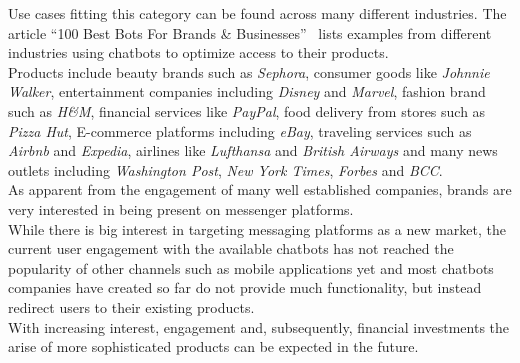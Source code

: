 Use cases fitting this category can be found across many different industries.
The article ``100 Best Bots For Brands \& Businesses''~\cite{topbots} lists examples from different industries using chatbots to optimize access to their products.
\\
Products include beauty brands such as \emph{Sephora}, consumer goods like \emph{Johnnie Walker}, entertainment companies including \emph{Disney} and \emph{Marvel}, fashion brand such as \emph{H\&M}, financial services like \emph{PayPal}, food delivery from stores such as \emph{Pizza Hut}, E-commerce platforms including \emph{eBay}, traveling services such as \emph{Airbnb} and \emph{Expedia}, airlines like \emph{Lufthansa} and \emph{British Airways} and many news outlets including \emph{Washington Post}, \emph{New York Times}, \emph{Forbes} and \emph{BCC}.
\\


As apparent from the engagement of many well established companies, brands are very interested in being present on messenger platforms.
\\

While there is big interest in targeting messaging platforms as a new market, the current user engagement with the available chatbots has not reached the popularity of other channels such as mobile applications yet
and most chatbots companies have created so far do not provide much functionality, but instead redirect users to their existing products.
\\

With increasing interest, engagement and, subsequently, financial investments the arise of more sophisticated products can be expected in the future.

